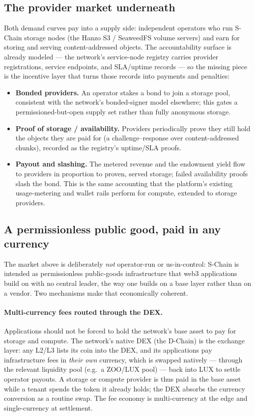 \subsection{The provider market underneath}

Both demand curves pay into a supply side: independent operators who run S-Chain
storage nodes (the Hanzo S3 / SeaweedFS volume servers) and earn for storing and
serving content-addressed objects. The accountability surface is already modeled
--- the network's service-node registry carries provider registrations, service
endpoints, and SLA/uptime records --- so the missing piece is the incentive
layer that turns those records into payments and penalties:

\begin{itemize}[leftmargin=1.4em]
  \item \textbf{Bonded providers.} An operator stakes a bond to join a storage
  pool, consistent with the network's bonded-signer model elsewhere; this gates
  a permissioned-but-open supply set rather than fully anonymous storage.
  \item \textbf{Proof of storage / availability.} Providers periodically prove
  they still hold the objects they are paid for (a challenge--response over
  content-addressed chunks), recorded as the registry's uptime/SLA proofs.
  \item \textbf{Payout and slashing.} The metered revenue and the endowment
  yield flow to providers in proportion to proven, served storage; failed
  availability proofs slash the bond. This is the same accounting that the
  platform's existing usage-metering and wallet rails perform for compute,
  extended to storage providers.
\end{itemize}

\subsection{A permissionless public good, paid in any currency}

The market above is deliberately \emph{not} operator-run or
us-in-control: S-Chain is intended as permissionless public-goods
infrastructure that web3 applications build on with no central leader, the way
one builds on a base layer rather than on a vendor. Two mechanisms make that
economically coherent.

\paragraph{Multi-currency fees routed through the DEX.} Applications should not
be forced to hold the network's base asset to pay for storage and compute. The
network's native DEX (the D-Chain) is the exchange layer: any L2/L3 lists its
coin into the DEX, and its applications pay infrastructure fees in \emph{their
own} currency, which is swapped natively --- through the relevant liquidity pool
(e.g.\ a ZOO/LUX pool) --- back into LUX to settle operator payouts. A storage
or compute provider is thus paid in the base asset while a tenant spends the
token it already holds; the DEX absorbs the currency conversion as a routine
swap. The fee economy is multi-currency at the edge and single-currency at
settlement.

